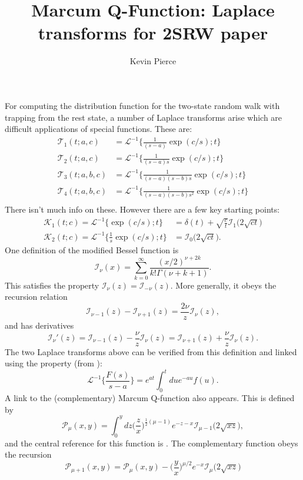 \documentclass[11pt]{article}
\title{Marcum Q-Function: Laplace transforms for 2SRW paper}
\author{Kevin Pierce}
\newcommand\be{\begin{equation}} %
\newcommand\ee{\end{equation}}   %
\newcommand\El{\mathcal{L}}
\begin{document}
\maketitle
For computing the distribution function for the two-state random walk with trapping from the rest state, a number of Laplace transforms arise which are difficult applications of special functions.
These are:
\begin{align}
\mathcal{T}_1(t;a,c) &= \El^{-1} \Big\{\frac{1}{(s-a)}\exp(c/s);t\Big\} \\
\mathcal{T}_2(t;a,c) &= \El^{-1} \Big\{\frac{1}{(s-a)s}\exp(c/s);t\Big\}\\
\mathcal{T}_3(t;a,b,c) &= \El^{-1} \Big\{\frac{1}{(s-a)(s-b)s}\exp(c/s);t\Big\} \\
\mathcal{T}_4(t;a,b,c) &= \El^{-1} \Big\{\frac{1}{(s-a)(s-b)s^2}\exp(c/s);t\Big\} \\
\end{align}
There isn't much info on these. However there are a few key starting points:
\begin{align}
\mathcal{K}_1(t;c)=\El^{-1} \Big\{\exp(c/s);t\Big\} &= \delta(t) +  \sqrt{\frac{c}{t}}\mathcal{I}_1\big(2\sqrt{ct}\big) \label{eq:key1}\\
\mathcal{K}_2(t;c) = \El^{-1} \Big\{\frac{1}{s}\exp(c/s);t\Big\} &= \mathcal{I}_0\big(2\sqrt{ct}\big) \label{eq:key2}.
\end{align}
One definition of the modified Bessel function is 
\be \mathcal{I}_\nu(x) = \sum_{k=0}^\infty \frac{(x/2)^{\nu+2k}}{k!\Gamma(\nu+k+1)}.\ee
This satisfies the property $\mathcal{I}_\nu(z) =  \mathcal{I}_{-\nu}(z)$.
More generally, it obeys the recursion relation
\be \mathcal{I}_{\nu-1}(z) - \mathcal{I}_{\nu+1}(z) = \frac{2\nu}{z}\mathcal{I}_\nu(z),\ee
and has derivatives 
\be \mathcal{I}_\nu'(z) = \mathcal{I}_{\nu-1}(z) - \frac{\nu}{z}\mathcal{I}_\nu(z) = \mathcal{I}_{\nu+1}(z) + \frac{\nu}{z}\mathcal{I}_{\nu}(z).\label{eq:Ideriv}\ee
The two Laplace transforms above can be verified from this definition and linked using the property (from \citet{Prudnikov1992a}):
\be \El^{-1}\Big\{\frac{F(s)}{s-a}\Big\} = e^{at}\int_0^t du e^{-au}f(u). \label{eq:shift}\ee
A link to the (complementary) Marcum Q-function also appears. This is defined by 
\be \mathcal{P}_\mu(x,y) = \int_0^y dz \Big(\frac{z}{x}\Big)^{\frac{1}{2}(\mu-1)} e^{-z-x}\mathcal{I}_{\mu-1}\big(2\sqrt{xz}\big),\ee
and the central reference for this function is \citet{Temme1996}.
The complementary function obeys the recursion
\be \mathcal{P}_{\mu+1}(x,y) = \mathcal{P}_\mu(x,y) - \Big(\frac{y}{x}\Big)^{\mu/2}e^{-x}\mathcal{I}_{\mu}\big(2\sqrt{xz}\big)\ee
\end{document}
